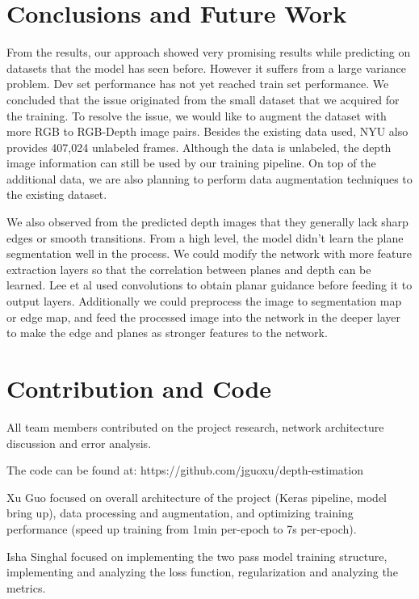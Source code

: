 \documentclass{article}
\begin{document}
\section{Conclusions and Future Work} \label{conclusion}
    From the results, our approach showed very promising results while predicting on datasets that the model has seen before. However it suffers from a large variance problem. Dev set performance has not yet reached train set performance. We concluded that the issue originated from the small dataset that we acquired for the training. To resolve the issue, we would like to augment the dataset with more RGB to RGB-Depth image pairs. Besides the existing data used, NYU also provides 407,024 unlabeled frames. Although the data is unlabeled, the depth image information can still be used by our training pipeline. On top of the additional data, we are also planning to perform data augmentation techniques to the existing dataset. 
    
    We also observed from the predicted depth images that they generally lack sharp edges or smooth transitions. From a high level, the model didn’t learn the plane segmentation well in the process. We could modify the network with more feature extraction layers so that the correlation between planes and depth can be learned. Lee et al \cite{pp4} used convolutions to obtain planar guidance before feeding it to output layers. Additionally we could preprocess the image to segmentation map or edge map, and feed the processed image into the network in the deeper layer to make the edge and planes as stronger features to the network. 

\section{Contribution and Code}
    All team members contributed on the project research, network architecture discussion and error analysis.
    
    The code can be found at: https://github.com/jguoxu/depth-estimation
    
    Xu Guo focused on overall architecture of the project (Keras pipeline, model bring up), data processing and augmentation, and optimizing training performance (speed up training from 1min per-epoch to 7s per-epoch). 
    
    Isha Singhal focused on implementing the two pass model training structure, implementing and analyzing the loss function, regularization and analyzing the metrics. 
    
\end{document}
